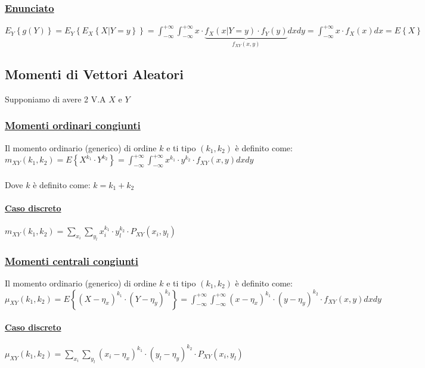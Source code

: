 \documentclass{article}
\begin{document}
\subsubsection{\underline{Enunciato}}
$E_Y \left\{ g(Y)\right\} = E_Y \left\{ E_X \left\{ X | Y = y \right\}\right\} = \int_{-\infty}^{+\infty} \int_{-\infty}^{+\infty} x \cdot \underset{f_{XY}(x,y)}{\underbrace{f_X(x|Y=y) \cdot f_Y(y)}} dx dy = \int_{-\infty}^{+\infty} x \cdot f_X(x) dx = E \left\{ X \right\}$

\subsection{Momenti di Vettori Aleatori}
Supponiamo di avere 2 V.A $X$ e $Y$
\subsubsection{\underline{Momenti ordinari congiunti}}
Il momento ordinario (generico) di ordine $k$ e ti tipo $\left( k_1,k_2\right)$ è definito come: \\
$m_{XY}(k_1,k_2) = E \left\{ X^{k_1} \cdot Y^{k_2} \right\} =\int_{-\infty}^{+\infty} \int_{-\infty}^{+\infty} x^{k_1} \cdot y^{k_2} \cdot f_{XY}(x,y) dx dy $ \\ \\
Dove $k$ è definito come: $k = k_1 + k_2$
\paragraph{\underline{Caso discreto}}
$m_{XY}(k_1,k_2) = \sum_{x_i} \sum_{y_l} x_i^{k_1} \cdot y_l^{k_2} \cdot P_{XY}(x_i,y_l)$
\subsubsection{\underline{Momenti centrali congiunti}}
Il momento ordinario (generico) di ordine $k$ e ti tipo $\left( k_1,k_2\right)$ è definito come: \\
$\mu_{XY}(k_1,k_2) = E \left\{ (X-\eta_x)^{k_1} \cdot (Y-\eta_y)^{k_2} \right\} = \int_{-\infty}^{+\infty} \int_{-\infty}^{+\infty} (x-\eta_x)^{k_1} \cdot (y-\eta_y)^{k_2} \cdot f_{XY}(x,y) dx dy$
\paragraph{\underline{Caso discreto}}
$\mu_{XY}(k_1,k_2) = \sum_{x_i} \sum_{y_l} (x_i-\eta_x)^{k_1} \cdot (y_l-\eta_y)^{k_2} \cdot P_{XY}(x_i,y_l)$
\end{document}
